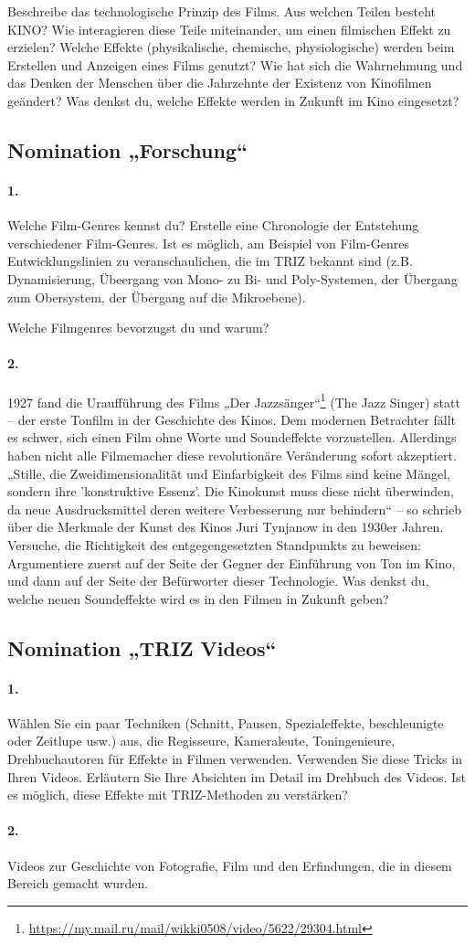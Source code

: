\documentclass[11pt,a4paper]{article}
\newcommand{\kinotools}{
\paragraph{1.}
Wählen Sie ein paar Techniken (Schnitt, Pausen, Spezialeffekte, beschleunigte
oder Zeitlupe usw.) aus, die Regisseure, Kameraleute, Toningenieure,
Drehbuchautoren für Effekte in Filmen verwenden. Verwenden Sie diese Tricks in
Ihren Videos.  Erläutern Sie Ihre Absichten im Detail im Drehbuch des
Videos. Ist es möglich, diese Effekte mit TRIZ-Methoden zu verstärken?

\paragraph{2.}
Videos zur Geschichte von Fotografie, Film und den Erfindungen, die in diesem
Bereich gemacht wurden.  }
\begin{document}
Beschreibe das technologische Prinzip des Films. Aus welchen Teilen besteht
KINO?  Wie interagieren diese Teile miteinander, um einen filmischen Effekt zu
erzielen?  Welche Effekte (physikalische, chemische, physiologische) werden
beim Erstellen und Anzeigen eines Films genutzt? Wie hat sich die Wahrnehmung
und das Denken der Menschen über die Jahrzehnte der Existenz von Kinofilmen
geändert?  Was denkst du, welche Effekte werden in Zukunft im Kino eingesetzt?

\subsection*{Nomination „Forschung“}

\paragraph{1.}
Welche Film-Genres kennst du? Erstelle eine Chronologie der Entstehung
verschiedener Film-Genres. Ist es möglich, am Beispiel von Film-Genres
Entwicklungslinien zu veranschaulichen, die im TRIZ bekannt sind
(z.B. Dynamisierung, Übeergang von Mono- zu Bi- und Poly-Systemen, der
Übergang zum Obersystem, der Übergang auf die Mikroebene).

Welche Filmgenres bevorzugst du und warum?

\paragraph{2.}
1927 fand die Uraufführung des Films „Der
Jazzsänger“\footnote{\url{https://my.mail.ru/mail/wikki0508/video/5622/29304.html}}
(The Jazz Singer) statt -- der erste Tonfilm in der Geschichte des Kinos. Dem
modernen Betrachter fällt es schwer, sich einen Film ohne Worte und
Soundeffekte vorzustellen. Allerdings haben nicht alle Filmemacher diese
revolutionäre Veränderung sofort akzeptiert. „Stille, die Zweidimensionalität
und Einfarbigkeit des Films sind keine Mängel, sondern ihre 'konstruktive
Essenz'.  Die Kinokunst muss diese nicht überwinden, da neue Ausdrucksmittel
deren weitere Verbesserung nur behindern“ -- so schrieb über die Merkmale der
Kunst des Kinos Juri Tynjanow in den 1930er Jahren. Versuche, die Richtigkeit
des entgegengesetzten Standpunkts zu beweisen: Argumentiere zuerst auf der
Seite der Gegner der Einführung von Ton im Kino, und dann auf der Seite der
Befürworter dieser Technologie. Was denkst du, welche neuen Soundeffekte wird
es in den Filmen in Zukunft geben?

\subsection*{Nomination „TRIZ Videos“}
\kinotools
\end{document}
